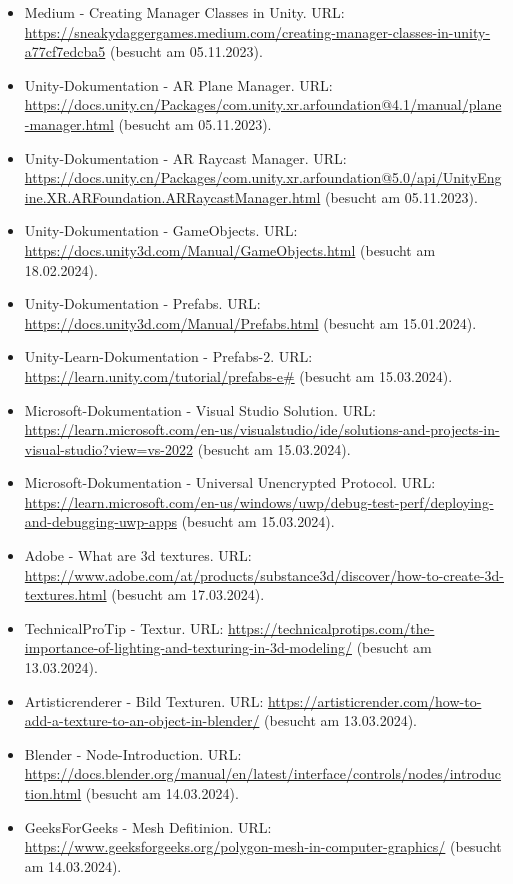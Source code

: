\begin{itemize}
    \item Medium - Creating Manager Classes in Unity. URL: \url{https://sneakydaggergames.medium.com/creating-manager-classes-in-unity-a77cf7edcba5} (besucht am 05.11.2023).
    \item Unity-Dokumentation - AR Plane Manager. URL: \url{https://docs.unity.cn/Packages/com.unity.xr.arfoundation@4.1/manual/plane-manager.html} (besucht am 05.11.2023).
    \item Unity-Dokumentation - AR Raycast Manager. URL: \url{https://docs.unity.cn/Packages/com.unity.xr.arfoundation@5.0/api/UnityEngine.XR.ARFoundation.ARRaycastManager.html} (besucht am 05.11.2023).
    \item Unity-Dokumentation - GameObjects. URL: \url{https://docs.unity3d.com/Manual/GameObjects.html} (besucht am 18.02.2024).
    \item Unity-Dokumentation - Prefabs. URL: \url{https://docs.unity3d.com/Manual/Prefabs.html} (besucht am 15.01.2024).
    \item Unity-Learn-Dokumentation - Prefabs-2. URL: \url{https://learn.unity.com/tutorial/prefabs-e#} (besucht am 15.03.2024).
    \item Microsoft-Dokumentation - Visual Studio Solution. URL: \url{https://learn.microsoft.com/en-us/visualstudio/ide/solutions-and-projects-in-visual-studio?view=vs-2022} (besucht am 15.03.2024).
    \item Microsoft-Dokumentation - Universal Unencrypted Protocol. URL: \url{https://learn.microsoft.com/en-us/windows/uwp/debug-test-perf/deploying-and-debugging-uwp-apps} (besucht am 15.03.2024).
    \item Adobe - What are 3d textures. URL: \url{https://www.adobe.com/at/products/substance3d/discover/how-to-create-3d-textures.html} (besucht am 17.03.2024).
    \item TechnicalProTip - Textur. URL: \url{https://technicalprotips.com/the-importance-of-lighting-and-texturing-in-3d-modeling/} (besucht am 13.03.2024).
    \item Artisticrenderer - Bild Texturen. URL: \url{https://artisticrender.com/how-to-add-a-texture-to-an-object-in-blender/} (besucht am 13.03.2024).
    \item Blender - Node-Introduction. URL: \url{https://docs.blender.org/manual/en/latest/interface/controls/nodes/introduction.html} (besucht am 14.03.2024).
    \item GeeksForGeeks - Mesh Defitinion. URL: \url{https://www.geeksforgeeks.org/polygon-mesh-in-computer-graphics/} (besucht am 14.03.2024).

\end{itemize}
